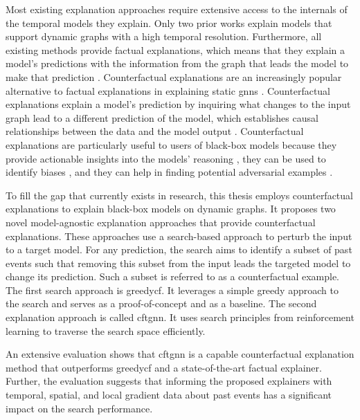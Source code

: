 Most existing explanation approaches require extensive access to the internals of the temporal models they explain. Only two prior works explain models that support dynamic graphs with a high temporal resolution. Furthermore, all existing methods provide factual explanations, which means that they explain a model's predictions with the information from the graph that leads the model to make that prediction \cite{tan_learning_2022}. Counterfactual explanations are an increasingly popular alternative to factual explanations in explaining static \glspl{gnn} \cite{prado-romero_survey_2023}. Counterfactual explanations explain a model's prediction by inquiring what changes to the input graph lead to a different prediction of the model, which establishes causal relationships between the data and the model output \cite{byrne_counterfactuals_2019, prado-romero_survey_2023}.
Counterfactual explanations are particularly useful to users of black-box models because they provide actionable insights into the models' reasoning \cite{lucic_cf-gnnexplainer_2022}, they can be used to identify biases \cite{prado-romero_survey_2023}, and they can help in finding potential adversarial examples \cite{lucic_cf-gnnexplainer_2022}.

To fill the gap that currently exists in research, this thesis employs counterfactual explanations to explain black-box models on dynamic graphs. It proposes two novel model-agnostic explanation approaches that provide counterfactual explanations. These approaches use a search-based approach to perturb the input to a target model. For any prediction, the search aims to identify a subset of past events such that removing this subset from the input leads the targeted model to change its prediction. Such a subset is referred to as a counterfactual example. The first search approach is \gls{greedycf}. It leverages a simple greedy approach to the search and serves as a proof-of-concept and as a baseline. The second explanation approach is called \gls{cftgnn}. It uses search principles from reinforcement learning to traverse the search space efficiently. 

An extensive evaluation shows that \gls{cftgnn} is a capable counterfactual explanation method that outperforms \gls{greedycf} and a state-of-the-art factual explainer. Further, the evaluation suggests that informing the proposed explainers with temporal, spatial, and local gradient data about past events has a significant impact on the search performance.


